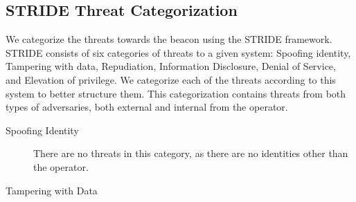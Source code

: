 \subsection{STRIDE Threat Categorization}
We categorize the threats towards the beacon using the STRIDE framework. STRIDE consists of six categories of threats to a given system: Spoofing identity, Tampering with data, Repudiation, Information Disclosure, Denial of Service, and Elevation of privilege. We categorize each of the threats according to this system to better structure them. This categorization contains threats from both types of adversaries, both external and internal from the operator.

\begin{description}
    \item [Spoofing Identity] There are no threats in this category, as there are no identities other than the operator.
    \item [Tampering with Data]


\end{description}
